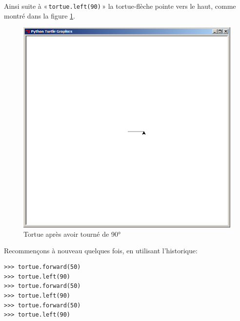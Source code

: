 Ainsi suite à « \texttt{tortue.left(90)} »  la tortue-flèche pointe vers le haut, comme montré dans la figure \ref{fig:90l}.
\begin{figure}[!ht]
\centering
\includegraphics[scale=0.3]{images/90l.png}
\caption{Tortue après avoir tourné de 90°}
\label{fig:90l}
\end{figure}

Recommençons à nouveau quelques fois, en utilisant l'historique:

\begin{Verbatim}[frame=single,rulecolor=\color{mbleu}, label=à taper]
>>> tortue.forward(50)
>>> tortue.left(90)
>>> tortue.forward(50)
>>> tortue.left(90)
>>> tortue.forward(50)
>>> tortue.left(90)
\end{Verbatim}

